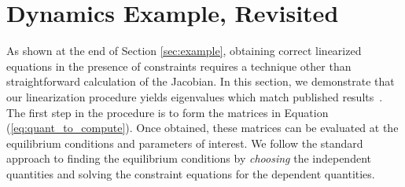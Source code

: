 \documentclass[smallcondensed,final]{svjour3}                     %
\begin{document}
%
%
%

%

\section{Dynamics Example, Revisited}
\label{sec:example_revisited}
As shown at the end of Section \ref{sec:example}, obtaining correct linearized
equations in the presence of constraints requires a technique other than
straightforward calculation of the Jacobian. In this section, we demonstrate
that our linearization procedure yields eigenvalues which match published
results~\cite{Schwab2003,Kane1985,Neimark1972}. The first step in the procedure
is to form the matrices in Equation (\ref{eq:quant_to_compute}). Once obtained,
these matrices can be evaluated at the equilibrium conditions and parameters of
interest. We follow the standard approach to finding the equilibrium conditions
by \textit{choosing} the independent quantities and solving the constraint
equations for the dependent quantities.
\end{document}
